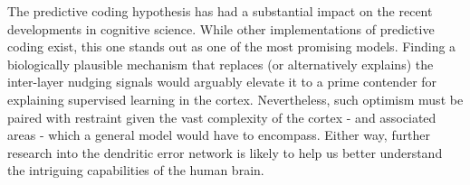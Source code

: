 The predictive coding hypothesis has had a substantial impact on the recent developments in cognitive science. While
other implementations of predictive coding exist, this one stands out as one of the most promising models. Finding a
biologically plausible mechanism that replaces (or alternatively explains) the inter-layer nudging signals would
arguably elevate it to a prime contender for explaining supervised learning in the cortex. Nevertheless, such optimism
must be paired with restraint given the vast complexity of the cortex - and associated areas - which a general model
would have to encompass. Either way, further research into the dendritic error network is likely to help us better
understand the intriguing capabilities of the human brain.